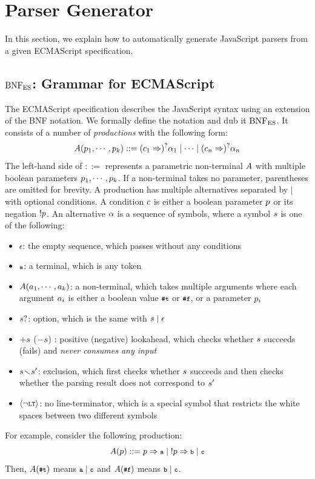 \section{Parser Generator}\label{sec:parser}
In this section, we explain how to automatically generate JavaScript
parsers from a given ECMAScript specification.

\subsection{\( \text{BNF}_{\text{ES}} \): Grammar for ECMAScript}
The ECMAScript specification describes the JavaScript syntax using an
extension of the BNF notation.  We formally define the notation and
dub it \( \text{BNF}_{\text{ES}} \).  It consists of a number of \textit{productions}
with the following form:
\[
  A(p_1, \cdots, p_k) ::=
  (c_1 \Rightarrow)^? \alpha_1 \mid
  \cdots \mid
  (c_n \Rightarrow)^? \alpha_n
\]
The left-hand side of $::=$ represents a parametric non-terminal \( A \)
with multiple boolean parameters \( p_1, \cdots, p_k \).
If a non-terminal takes no parameter, parentheses are omitted for brevity.
A production has multiple alternatives separated by $\mid$ with optional conditions.
A condition \( c \) is either a boolean parameter \( p \)
or its negation \( ! p \).  An alternative \( \alpha \) is a sequence
of symbols, where a symbol \( s \) is one of the following:
\begin{itemize}[leftmargin=0.5cm]
\item \( \epsilon \): the empty sequence, which passes without any conditions
\item \( \texttt{\footnotesize a} \): a terminal, which is any token
\item \( A(a_1, \cdots, a_k) \): a non-terminal,
which takes multiple arguments where each argument \( a_i \) is
either a boolean value \( \texttt{\footnotesize\#t} \) or \( \texttt{\footnotesize\#f} \), or a parameter \( p_i \)
\item \( s? \): option, which is the same with \( s \mid \epsilon \)
\item \( +s \) (\( -s \)) : positive (negative) lookahead,
which checks whether \( s \) succeeds (fails) and
\textit{never consumes any input}
\item \( s \!\smallsetminus\! s' \): exclusion, which
first checks whether \( s \) succeeds
and then checks whether the parsing result does not correspond to \( s' \)
\item \( \left<\neg\texttt{\footnotesize LT}\right> \): no line-terminator, which is a special symbol
that restricts the white spaces between two different symbols
\end{itemize}
For example, consider the following production:
\[
  A(p) ::= p \Rightarrow \texttt{\footnotesize a}
  \mid \; !p \Rightarrow \texttt{\footnotesize b}
  \mid  \texttt{\footnotesize c}
\]
Then, \( A(\texttt{\footnotesize\#t}) \) means \( \texttt{\footnotesize a} \mid \texttt{\footnotesize c} \)
and \( A(\texttt{\footnotesize\#f}) \) means \( \texttt{\footnotesize b} \mid \texttt{\footnotesize c} \).

